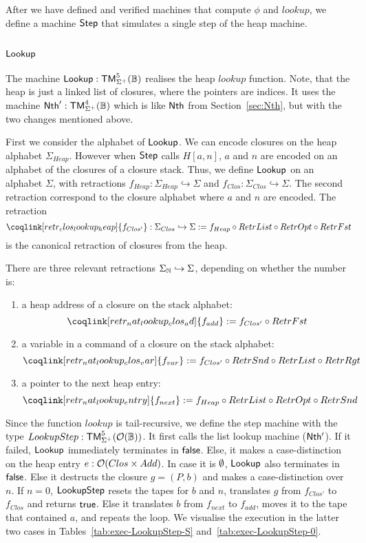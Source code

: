 After we have defined and verified machines that compute $\phi$ and $lookup$, we define a machine $\mathsf{Step}$ that simulates a single step of the heap
machine.


\subsection{$\mathsf{Lookup}$}
\label{sec:Lookup}
%

The machine $\mathsf{Lookup} : \mathsf{TM}_{\Sigma^+}^5(\mathbb{B})$ realises the heap $lookup$ function.  Note, that the heap is just a linked list of closures, where
the pointers are indices.  It uses the machine $\mathsf{Nth}' : \mathsf{TM}_{\Sigma^+}^4(\mathbb{B})$ which is like $\mathsf{Nth}$ from Section~\ref{sec:Nth}, but with the
two changes mentioned above.

First we consider the alphabet of $\mathsf{Lookup}$.  We can encode closures on the heap alphabet $\Sigma_{Heap}$.  However when $\mathsf{Step}$ calls
$H[a,n]$, $a$ and $n$ are encoded on an alphabet of the closures of a closure stack.  Thus, we define $\mathsf{Lookup}$ on an alphabet $\Sigma$, with
retractions $f_{Heap} : \Sigma_{Heap} \hookrightarrow \Sigma$ and $f_{Clos} : \Sigma_{Clos} \hookrightarrow \Sigma$.  The second retraction correspond
to the closure alphabet where $a$ and $n$ are encoded.  The retraction
\[
  \coqlink[retr_clos_lookup_heap]{f_{Clos'}} : \Sigma_{Clos} \hookrightarrow \Sigma := f_{Heap} \circ RetrList \circ RetrOpt \circ RetrFst 
\]
is the canonical retraction of closures from the heap.

There are three relevant retractions $\Sigma_{\mathbb{N}} \hookrightarrow \Sigma$, depending on whether the number is:
\begin{enumerate}
\item a heap address of a closure on the stack alphabet:
  \[
    \coqlink[retr_nat_lookup_clos_ad]{f_{add}} := f_{Clos'} \circ RetrFst
  \]
\item a variable in a command of a closure on the stack alphabet:
  \[
    \coqlink[retr_nat_lookup_clos_var]{f_{var}} := f_{Clos'} \circ RetrSnd \circ RetrList \circ RetrRgt
  \]
\item a pointer to the next heap entry:
  \[
    \coqlink[retr_nat_lookup_entry]{f_{next}} :=  f_{Heap} \circ RetrList \circ RetrOpt \circ RetrSnd 
  \]
\end{enumerate}

Since the function $lookup$ is tail-recursive, we define the step machine with the type $LookupStep : \mathsf{TM}_{\Sigma^+}^5(\mathcal{O}(\mathbb{B}))$.  It first
calls the list lookup machine ($\mathsf{Nth'}$).  If it failed, $\mathsf{Lookup}$ immediately terminates in $\mathsf{false}$.  Else, it makes a case-distinction on
the heap entry $e : \mathcal{O}(Clos \times Add)$.  In case it is $\emptyset$, $\mathsf{Lookup}$ also terminates in $\mathsf{false}$.  Else it destructs the closure
$g = (P,b)$ and makes a case-distinction over $n$.  If $n=0$, $\mathsf{LookupStep}$ resets the tapes for $b$ and $n$, translates $g$ from $f_{Clos'}$ to
$f_{Clos}$ and returns $\mathsf{true}$.  Else it translates $b$ from $f_{next}$ to $f_{add}$, moves it to the tape that contained $a$, and repeats the loop.
We visualise the execution in the latter two cases in Tables~\ref{tab:exec-LookupStep-S} and~\ref{tab:exec-LookupStep-0}.


